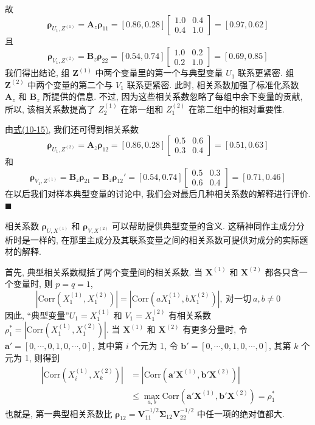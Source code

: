 
故
\[
\boldsymbol{\rho}_{U_1,Z^{(1)}}=\mathbf{A}_z\boldsymbol{\rho}_{11}=[0.86,0.28]\begin{bmatrix}1.0 & 0.4\\ 0.4 & 1.0\end{bmatrix}=[0.97,0.62]
\]
且
\[
\boldsymbol{\rho}_{V_1,Z^{(2)}}=\mathbf{B}_z\boldsymbol{\rho}_{22}=[0.54,0.74]\begin{bmatrix}1.0 & 0.2\\ 0.2 & 1.0\end{bmatrix}=[0.69,0.85]
\]
我们得出结论, 组 $\mathbf{Z}^{(1)}$ 中两个变量里的第一个与典型变量 $U_1$ 联系更紧密. 组 $\mathbf{Z}^{(2)}$ 中两个变量的第二个与 $V_1$ 联系更紧密. 此时, 相关系数加强了标准化系数 $\mathbf{A}_z$ 和 $\mathbf{B}_z$ 所提供的信息. 不过, 因为这些相关系数忽略了每组中余下变量的贡献, 所以, 该相关系数提高了 $Z_2^{(1)}$ 在第一组和 $Z_1^{(2)}$ 在第二组中的相对重要性.

由\hyperref[eq:10-15]{式(10-15)}, 我们还可得到相关系数
\[
\boldsymbol{\rho}_{U_1,Z^{(2)}}=\mathbf{A}_z\boldsymbol{\rho}_{12}=[0.86,0.28]\begin{bmatrix}0.5 & 0.6\\ 0.3 & 0.4\end{bmatrix}=[0.51,0.63]
\]
和
\[
\boldsymbol{\rho}_{V_1,Z^{(1)}}=\mathbf{B}_z\boldsymbol{\rho}_{21}=\mathbf{B}_z\boldsymbol{\rho}_{12}'=[0.54,0.74]\begin{bmatrix}0.5 & 0.3\\ 0.6 & 0.4\end{bmatrix}=[0.71,0.46]
\]
在以后我们对样本典型变量的讨论中, 我们会对最后几种相关系数的解释进行评价.\hfill$\blacksquare$

相关系数 $\boldsymbol{\rho}_{U,X^{(1)}}$ 和 $\boldsymbol{\rho}_{V,X^{(2)}}$ 可以帮助提供典型变量的含义. 这精神同作主成分分析时是一样的, 在那里主成分及其联系变量之间的相关系数可提供对成分的实际题材的解释.


首先, 典型相关系数概括了两个变量间的相关系数. 当 $\mathbf{X}^{(1)}$ 和 $\mathbf{X}^{(2)}$ 都各只含一个变量时, 则 $p=q=1$,
\[
|\mathrm{Corr}(X_1^{(1)},X_1^{(2)})|=|\mathrm{Corr}(aX_1^{(1)},bX_1^{(2)})|,\ \text{对一切}\ a,b\ne 0
\]
因此, “典型变量”$U_1=X_1^{(1)}$ 和 $V_1=X_1^{(2)}$ 有相关系数 $\rho_1^*=|\mathrm{Corr}(X_1^{(1)},X_1^{(2)})|$. 当 $\mathbf{X}^{(1)}$ 和 $\mathbf{X}^{(2)}$ 有更多分量时, 令 $\mathbf{a}'=[0,\cdots,0,1,0,\cdots,0]$, 其中第 $i$ 个元为 1, 令 $\mathbf{b}'=[0,\cdots,0,1,0,\cdots,0]$, 其第 $k$ 个元为 1, 则得到
\label{eq:10-16}
\begin{equation}
\begin{aligned}
|\mathrm{Corr}(X_i^{(1)},X_k^{(2)})|&=|\mathrm{Corr}(\mathbf{a}'\mathbf{X}^{(1)},\mathbf{b}'\mathbf{X}^{(2)})|\\
&\le\max_{a,b}\mathrm{Corr}(\mathbf{a}'\mathbf{X}^{(1)},\mathbf{b}'\mathbf{X}^{(2)})=\rho_1^*
\end{aligned}
\tag{10-16}
\end{equation}
也就是, 第一典型相关系数比 $\boldsymbol{\rho}_{12}=\mathbf{V}_{11}^{-1/2}\boldsymbol{\Sigma}_{12}\mathbf{V}_{22}^{-1/2}$ 中任一项的绝对值都大.

